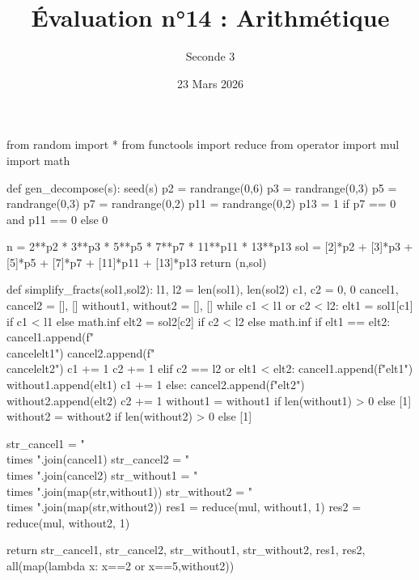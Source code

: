 \documentclass{controle}
\title{Évaluation n°14 : Arithmétique}
\author{Seconde 3}
\date{23 Mars 2026}
\begin{document}
\begin{pycode}
from random import *
from functools import reduce
from operator import mul
import math

def gen_decompose(s):
  seed(s)
  p2 = randrange(0,6)
  p3 = randrange(0,3)
  p5 = randrange(0,3)
  p7 = randrange(0,2)
  p11 = randrange(0,2)
  p13 = 1 if p7 == 0 and p11 == 0 else 0

  n = 2**p2 * 3**p3 * 5**p5 * 7**p7 * 11**p11 * 13**p13
  sol = [2]*p2 + [3]*p3 + [5]*p5 + [7]*p7 + [11]*p11 + [13]*p13
  return (n,sol)

def simplify_fracts(sol1,sol2):
  l1, l2 = len(sol1), len(sol2)
  c1, c2 = 0, 0
  cancel1, cancel2 = [], []
  without1, without2 = [], []
  while c1 < l1 or c2 < l2:
    elt1 = sol1[c1] if c1 < l1 else math.inf
    elt2 = sol2[c2] if c2 < l2 else math.inf
    if elt1 == elt2:
      cancel1.append(f"\\cancel{{{elt1}}}")
      cancel2.append(f"\\cancel{{{elt2}}}")
      c1 += 1
      c2 += 1
    elif c2 == l2 or elt1 < elt2:
      cancel1.append(f"{elt1}")
      without1.append(elt1)
      c1 += 1
    else:
      cancel2.append(f"{elt2}")
      without2.append(elt2)
      c2 += 1
  without1 = without1 if len(without1) > 0 else [1]
  without2 = without2 if len(without2) > 0 else [1]

  str_cancel1 = " \\times ".join(cancel1) 
  str_cancel2 = " \\times ".join(cancel2)
  str_without1 = " \\times ".join(map(str,without1)) 
  str_without2 = " \\times ".join(map(str,without2))
  res1 = reduce(mul, without1, 1)
  res2 = reduce(mul, without2, 1)


  return str_cancel1, str_cancel2, str_without1, str_without2, res1, res2, all(map(lambda x: x==2 or x==5,without2))
\end{pycode}
\end{document}
